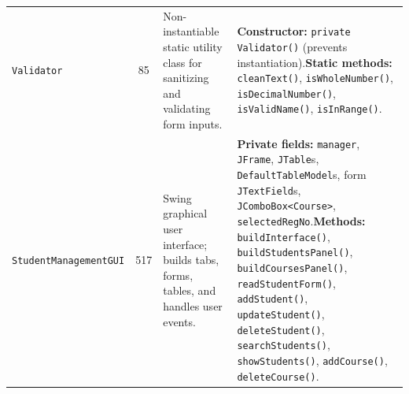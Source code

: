 \documentclass[10pt,a4paper]{article}
\begin{document}
\begin{table}[H]
\begin{tabular}{@{}p{3.1cm} c p{4.4cm} p{8.8cm}@{}}
\addlinespace[1pt]
\texttt{Validator} & 85 & Non-instantiable static utility class for sanitizing and validating form inputs. & \textbf{Constructor:} \texttt{private Validator()} (prevents instantiation).\newline \textbf{Static methods:} \texttt{cleanText()}, \texttt{isWholeNumber()}, \texttt{isDecimalNumber()}, \texttt{isValidName()}, \texttt{isInRange()}. \\
\addlinespace[1pt]
\texttt{StudentManagementGUI} & 517 & Swing graphical user interface; builds tabs, forms, tables, and handles user events. & \textbf{Private fields:} \texttt{manager}, \texttt{JFrame}, \texttt{JTable}s, \texttt{DefaultTableModel}s, form \texttt{JTextField}s, \texttt{JComboBox<Course>}, \texttt{selectedRegNo}.\newline \textbf{Methods:} \texttt{buildInterface()}, \texttt{buildStudentsPanel()}, \texttt{buildCoursesPanel()}, \texttt{readStudentForm()}, \texttt{addStudent()}, \texttt{updateStudent()}, \texttt{deleteStudent()}, \texttt{searchStudents()}, \texttt{showStudents()}, \texttt{addCourse()}, \texttt{deleteCourse()}. \\
\bottomrule
\end{tabular}
\end{table}
\end{document}
